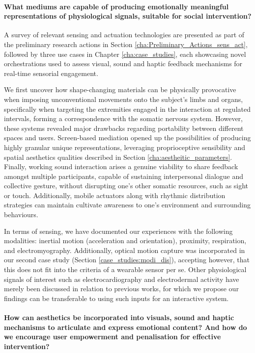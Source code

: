 \paragraph{What mediums are capable of producing emotionally meaningful representations of physiological signals, suitable for social intervention?}

A survey of relevant sensing and actuation technologies are presented as part of the preliminary research actions in Section \ref{cha:Preliminary_Actions_sens_act}, followed by three use cases in Chapter \ref{cha:case_studies}, each showcasing novel orchestrations used to assess visual, sound and haptic feedback mechanisms for real-time sensorial engagement.

We first uncover how shape-changing materials can be physically provocative when imposing unconventional movements onto the subject's limbs and organs, specifically when targeting the extremities engaged in the interaction at regulated intervals, forming a correspondence with the somatic nervous system. However, these systems revealed major drawbacks regarding portability between different spaces and users. Screen-based mediation opened up the possibilities of producing highly granular unique representations, leveraging proprioceptive sensibility and spatial aesthetics qualities described in Section \ref{cha:aestheitic_parameters}. Finally, working sound interaction arises a genuine viability to share feedback amongst multiple participants, capable of sustaining interpersonal dialogue and collective gesture, without disrupting one's other somatic resources, such as sight or touch. Additionally, mobile actuators along with rhythmic distribution strategies can maintain cultivate awareness to one's environment and surrounding behaviours.

In terms of sensing, we have documented our experiences with the following modalities: inertial motion (acceleration and orientation), proximity, respiration, and electromyography. Additionally, optical motion capture was incorporated in our second case study (Section \ref{case_studies:modi_dis}), accepting however, that this does not fit into the criteria of a wearable sensor per se. Other physiological signals of interest such as electrocardiography and electrodermal activity have merely been discussed in relation to previous works, for which we propose our findings can be transferable to using such inputs for an interactive system.

\paragraph{How can aesthetics be incorporated into visuals, sound and haptic mechanisms to articulate and express emotional content? And how do we encourage user empowerment and penalisation for effective intervention?}


